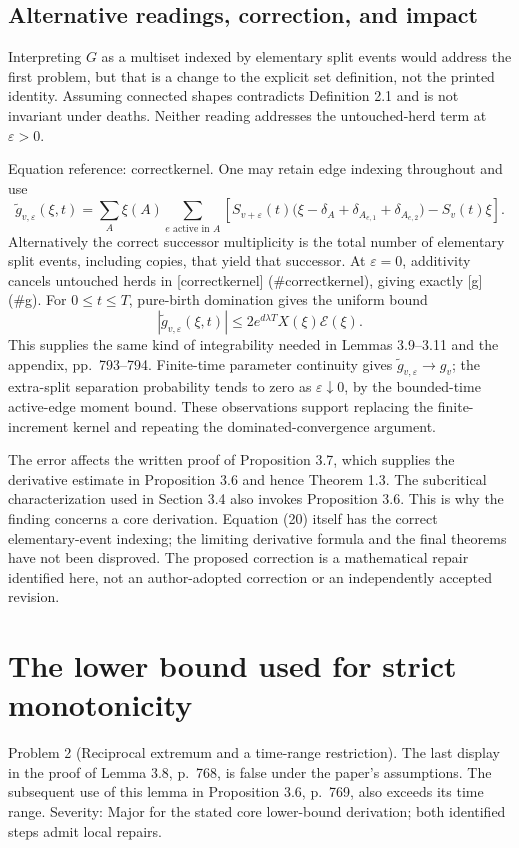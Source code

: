 \documentclass[10pt]{article}
\begin{document}
\subsection*{Alternative readings, correction, and impact}
Interpreting \(G\) as a multiset indexed by elementary split events would address the first problem, but that is a change to the explicit set definition, not the printed identity. Assuming connected shapes contradicts Definition 2.1 and is not invariant under deaths. Neither reading addresses the untouched-herd term at \(\varepsilon>0\).\par
Equation reference: correctkernel. One may retain edge indexing throughout and use \[
 \widetilde g_{v,\varepsilon}(\xi,t)
 =\sum_A\xi(A)\sum_{e\text{ active in }A}
 \left[S_{v+\varepsilon}(t)
    \bigl(\xi-\delta_A+\delta_{A_{e,1}}+\delta_{A_{e,2}}\bigr)
       -S_v(t)\xi\right].\] Alternatively the correct successor multiplicity is the total number of elementary split events, including copies, that yield that successor. At \(\varepsilon=0\), additivity cancels untouched herds in [correctkernel] (\#correctkernel), giving exactly [g] (\#g). For \(0\leq t\leq T\), pure-birth domination gives the uniform bound \[|\widetilde g_{v,\varepsilon}(\xi,t)|
 \leq 2e^{d\lambda T}X(\xi)\mathcal E(\xi).\] This supplies the same kind of integrability needed in Lemmas 3.9–3.11 and the appendix, pp. 793–794. Finite-time parameter continuity gives \(\widetilde g_{v,\varepsilon}\to g_v\); the extra-split separation probability tends to zero as \(\varepsilon\downarrow0\), by the bounded-time active-edge moment bound. These observations support replacing the finite-increment kernel and repeating the dominated-convergence argument.\par
The error affects the written proof of Proposition 3.7, which supplies the derivative estimate in Proposition 3.6 and hence Theorem 1.3. The subcritical characterization used in Section 3.4 also invokes Proposition 3.6. This is why the finding concerns a core derivation. Equation (20) itself has the correct elementary-event indexing; the limiting derivative formula and the final theorems have not been disproved. The proposed correction is a mathematical repair identified here, not an author-adopted correction or an independently accepted revision.\par
\section*{The lower bound used for strict monotonicity}
Problem 2 (Reciprocal extremum and a time-range restriction).  The last display in the proof of Lemma 3.8, p. 768, is false under the paper’s assumptions. The subsequent use of this lemma in Proposition 3.6, p. 769, also exceeds its time range. Severity: Major for the stated core lower-bound derivation; both identified steps admit local repairs.\par
\end{document}
